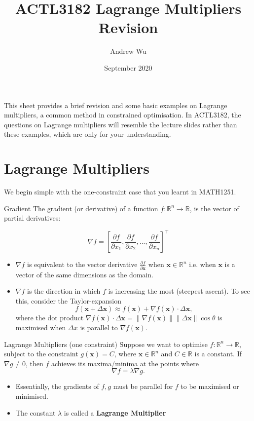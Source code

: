 \documentclass[11pt]{article}
\title{\textbf{ACTL3182 Lagrange Multipliers Revision}}
\author{Andrew Wu}
\date{September 2020}
\newcommand{\R}{\mathbb{R}}
\newcommand{\vx}{\bm{x}}
\begin{document}
	\maketitle
	\noindent This sheet provides a brief revision and some basic examples on Lagrange multipliers, a common method in constrained optimisation. In ACTL3182, the questions on Lagrange multipliers will resemble the lecture slides rather than these examples, which are only for your understanding.
	
	\section{Lagrange Multipliers}
	We begin simple with the one-constraint case that you learnt in MATH1251.
	\begin{definition}{Gradient}{}
		The gradient (or derivative) of a function \( f:\R^{n}\to\R \), is the vector of partial derivatives:

		\[	\nabla f =		\left[\frac{\partial f}{\partial x_1}  , \frac{\partial f}{\partial x_2} , ... , \frac{\partial f}{\partial x_n}\right]^{\top}				
			\]
		\tcblower
		\begin{itemize}
			\item \( \nabla f \) is equivalent to the vector derivative \( \frac{\partial f}{\partial \bm{x}} \) when \( \vx\in\R^n \) i.e. when \( \vx \) is a vector of the same dimensions as the domain.
			\item \( \nabla f \) is the direction in which $f$ is increasing the most (steepest ascent). To see this, consider the Taylor-expansion
			\[	f(\bm{x}+\Delta \bm{x}) \approx f(\bm{x}) + \nabla f(\bm{x})\cdot\Delta\bm{x},
				\]
			where the dot product $\nabla f(\bm{x})\cdot\Delta\bm{x}=\lVert \nabla f(\bm{x})\rVert\lVert \Delta\bm{x}\rVert\cos\theta$ is maximised when $\Delta x$ is parallel to $\nabla f(\bm{x})$.
		\end{itemize}
	\end{definition}
	\bigskip
	\noindent 
	\begin{theorem}{Lagrange Multipliers (one constraint)}{}
		Suppose we want to optimise \( f:\R^n \to\R \), subject to the constraint 
		\(	g(\vx) = C\),
		where \( \vx\in\R^n \)	and \( C\in\R \) is a constant. If \( \nabla g \neq 0 \), then \( f \) achieves its maxima/minima at the points where 
		\[	\nabla f = \lambda \nabla g.\]
		\tcblower
		\begin{itemize}
			\item Essentially, the gradients of \( f,g \) must be parallel for \( f \) to be maximised or minimised.
			\item The constant \( \lambda \) is called a \textbf{Lagrange Multiplier}
		\end{itemize} 
	\end{theorem}
\end{document}
